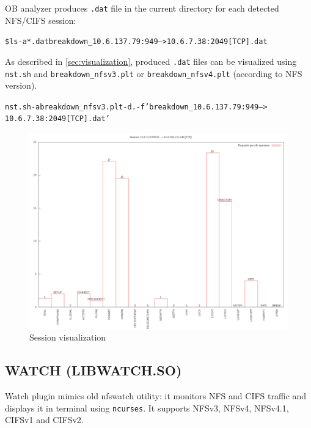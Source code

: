 \documentclass[oneside]{article}
\newcommand{\code}[1]{\texttt{#1}}
\newcommand{\includetext}[1]{
\begin{alltt}
    \small{}
\end{alltt}
}
\newcommand{\gls}{}
\begin{document}
OB analyzer produces \code{.dat} file in the current directory for each detected
NFS/CIFS session:
\begin{alltt}
\$ ls -a *.dat breakdown\_10.6.137.79:949 --> 10.6.7.38:2049 [TCP].dat
\end{alltt} 
As described in \ref{sec:visualization}, produced \code{.dat}
files can be visualized using \code{nst.sh} and \code{breakdown\_nfsv3.plt} or
\code{breakdown\_nfsv4.plt} (according to \gls{NFS} version).
\begin{alltt} 
nst.sh -a breakdown\_nfsv3.plt -d . -f 'breakdown\_10.6.137.79:949 -->
10.6.7.38:2049 [TCP].dat' 
\end{alltt}

\begin{figure}
\includegraphics[width=\linewidth]{./pictures/session-visualization.png}
\caption{Session visualization}
\label{Session visualization}
\centering
\end{figure}

\subsection{WATCH (LIBWATCH.SO)}

Watch plugin mimics old nfswatch utility: it monitors \gls{NFS} and \gls{CIFS}
traffic and displays it in terminal using \code{ncurses}. It supports NFSv3, NFSv4,
NFSv4.1, CIFSv1 and CIFSv2.

\begin{minipage}[t]{\linewidth}
\includetext{nfstrace_manual_includes/libwatch_output.txt} 
\end{minipage}
\end{document}
